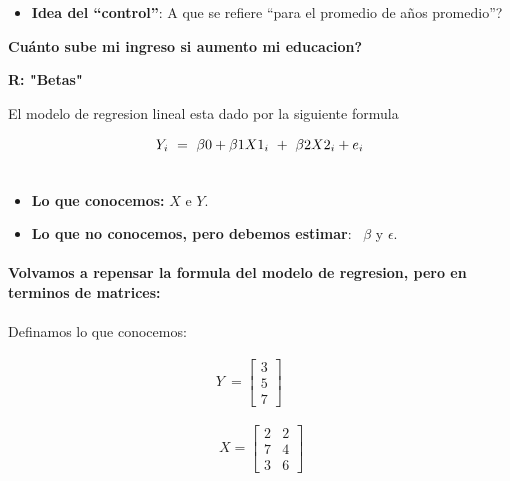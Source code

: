 \documentclass[10pt]{article}
\begin{document}
\begin{itemize}
\item \textbf{Idea del ``control''}: A que se refiere ``para el promedio de a\~nos promedio''?
\end{itemize}
\begin{center}






\textbf{Cu\'anto sube mi ingreso si aumento mi educacion? }

\textbf{R: "Betas"}

\end{center}

\begin{center}
El modelo de regresion lineal esta dado por la siguiente formula
\end{center}
\begin{center}

\begin{gather}
Y_{i} \ =\ \beta 0+\beta 1X1_{i} \ +\ \beta 2X2_{i} +e_{i} \notag\\
 \notag
\end{gather}
\end{center}




\begin{itemize}
\item \textbf{Lo que conocemos:} $\displaystyle X$ e $\displaystyle Y$. 
\item \textbf{Lo que no conocemos, pero debemos estimar}: \ $\displaystyle \beta $ y $\displaystyle \epsilon $.
\end{itemize}



\paragraph{}{\Large \textbf{Volvamos a repensar la formula del modelo de regresion, pero en terminos de matrices:}}



\paragraph{}Definamos lo que conocemos:


\begin{gather*}
Y\ =\begin{bmatrix}
3\\
5\\
7
\end{bmatrix}\\
\\
\\
\ X=\begin{bmatrix}
2 & 2\\
7 & 4\\
3 & 6
\end{bmatrix}
\end{gather*}
\begin{equation*}
\end{equation*}
\end{document}
